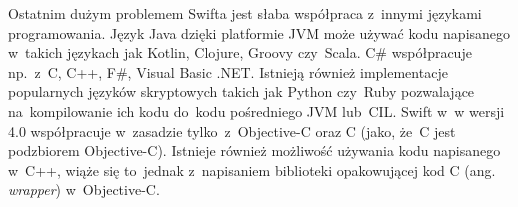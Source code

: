 \documentclass[mgr, shortabstract]{iithesis}
\newcommand{\ang}[1]{ang. \textit{#1}}
\begin{document}
Ostatnim dużym problemem Swifta jest słaba współpraca z~innymi językami programowania. Język Java dzięki platformie JVM może używać kodu napisanego w~takich językach jak Kotlin, Clojure, Groovy czy~Scala. C\# współpracuje np.~z~C, C++, F\#, Visual Basic .NET. Istnieją również implementacje popularnych języków skryptowych takich jak Python czy~Ruby pozwalające na~kompilowanie ich kodu do~kodu pośredniego JVM lub~CIL. Swift w~w wersji 4.0 współpracuje w~zasadzie tylko~z~Objective-C oraz C (jako, że~C jest podzbiorem Objective-C). Istnieje również możliwość używania kodu napisanego w~C++, wiąże się to~jednak z~napisaniem biblioteki opakowującej kod C (\ang{wrapper}) w~Objective-C.


\end{document}

